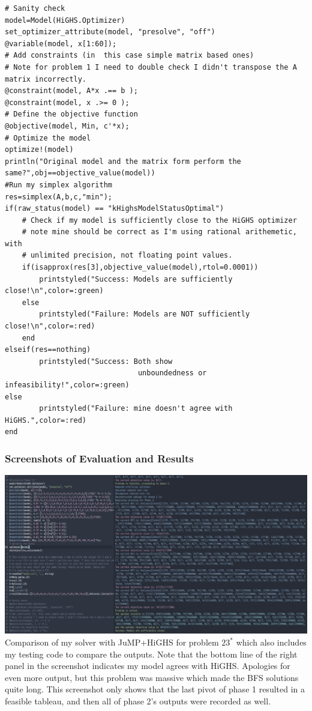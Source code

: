 \documentclass[11pt]{article}
\begin{document}
\begin{verbatim}
# Sanity check
model=Model(HiGHS.Optimizer)
set_optimizer_attribute(model, "presolve", "off")
@variable(model, x[1:60]);
# Add constraints (in  this case simple matrix based ones)
# Note for problem 1 I need to double check I didn't transpose the A matrix incorrectly.
@constraint(model, A*x .== b );
@constraint(model, x .>= 0 );
# Define the objective function
@objective(model, Min, c'*x);
# Optimize the model
optimize!(model)
println("Original model and the matrix form perform the same?",obj==objective_value(model))
#Run my simplex algorithm
res=simplex(A,b,c,"min");
if(raw_status(model) == "kHighsModelStatusOptimal")
    # Check if my model is sufficiently close to the HiGHS optimizer
    # note mine should be correct as I'm using rational arithemetic, with
    # unlimited precision, not floating point values.
    if(isapprox(res[3],objective_value(model),rtol=0.0001))
        printstyled("Success: Models are sufficiently close!\n",color=:green)
    else
        printstyled("Failure: Models are NOT sufficiently close!\n",color=:red)
    end
elseif(res==nothing)
        printstyled("Success: Both show
                               unboundedness or infeasibility!",color=:green)
else
        printstyled("Failure: mine doesn't agree with HiGHS.",color=:red)
end
\end{verbatim}

\subsubsection{Screenshots of Evaluation and Results}
\label{sec:org13dabec}
\begin{center}
\includegraphics[width=1\textwidth]{figure10.png}\\
Comparison of my solver with JuMP+HiGHS for problem $23^{*}$ which also includes my testing code to compare the outputs. Note that the bottom line of the right panel in the screenshot indicates my model agrees with HiGHS. Apologies for even more output, but this problem was massive which made the BFS solutions quite long. This screenshot only shows that the last pivot of phase 1 resulted in a feasible tableau, and then all of phase 2's outputs were recorded as well.
\end{center}
\end{document}
